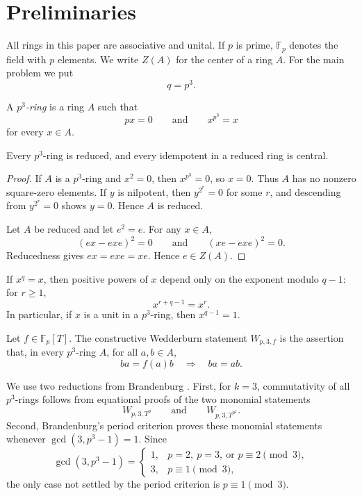 \section{Preliminaries}\label{sec:preliminaries}

All rings in this paper are associative and unital.  If \(p\) is prime, \(\mathbb F_p\) denotes the field with \(p\) elements.  We write \(Z(A)\) for the center of a ring \(A\).  For the main problem we put
\[
  q=p^3.
\]

\begin{definition}\label{def:p3-ring}
  A \emph{\(p^3\)-ring} is a ring \(A\) such that
  \[
    px=0
    \qquad\text{and}\qquad
    x^{p^3}=x
  \]
  for every \(x\in A\).
\end{definition}

\begin{lemma}\label{lem:reduced-idempotent}
  Every \(p^3\)-ring is reduced, and every idempotent in a reduced ring is central.
\end{lemma}

\begin{proof}
  If \(A\) is a \(p^3\)-ring and \(x^2=0\), then \(x^{p^3}=0\), so \(x=0\).  Thus \(A\) has no nonzero square-zero elements.  If \(y\) is nilpotent, then \(y^{2^r}=0\) for some \(r\), and descending from \(y^{2^r}=0\) shows \(y=0\).  Hence \(A\) is reduced.

  Let \(A\) be reduced and let \(e^2=e\).  For any \(x\in A\),
  \[
    (ex-exe)^2=0
    \qquad\text{and}\qquad
    (xe-exe)^2=0.
  \]
  Reducedness gives \(ex=exe=xe\).  Hence \(e\in Z(A)\).
\end{proof}

If \(x^q=x\), then positive powers of \(x\) depend only on the exponent modulo \(q-1\): for \(r\geq 1\),
\[
  x^{r+q-1}=x^r.
\]
In particular, if \(x\) is a unit in a \(p^3\)-ring, then \(x^{q-1}=1\).

\begin{definition}\label{def:wedderburn}
  Let \(f\in \mathbb F_p[T]\).  The constructive Wedderburn statement \(W_{p,3,f}\) is the assertion that, in every \(p^3\)-ring \(A\), for all \(a,b\in A\),
  \[
    ba=f(a)b
    \quad\Longrightarrow\quad
    ba=ab.
  \]
\end{definition}

We use two reductions from Brandenburg \cite{brandenburg2023}.  First, for \(k=3\), commutativity of all \(p^3\)-rings follows from equational proofs of the two monomial statements
\[
  W_{p,3,T^p}
  \qquad\text{and}\qquad
  W_{p,3,T^{p^2}}.
\]
Second, Brandenburg's period criterion proves these monomial statements whenever \(\gcd(3,p^3-1)=1\).  Since
\[
  \gcd(3,p^3-1)=
  \begin{cases}
    1, & p=2,\ p=3,\ \text{or }p\equiv 2 \pmod 3,\\
    3, & p\equiv 1 \pmod 3,
  \end{cases}
\]
the only case not settled by the period criterion is \(p\equiv 1 \pmod 3\).

